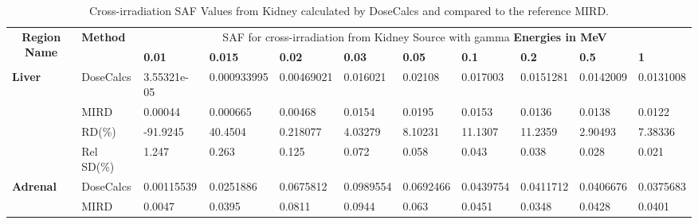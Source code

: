 \documentclass[letterpaper,12pt]{article}
\begin{document}
\begin{table}[H] 
\centering
\caption{Cross-irradiation SAF Values from Kidney calculated by DoseCalcs and compared to the reference MIRD. } 
\begin{adjustbox}{width=\columnwidth,center}
\begin{threeparttable}
\begin{tabular}{lllllllllll} \hline 
\multicolumn{1}{c}{\multirow{2}{*}{\textbf{Region Name}}} & \multirow{2}{*}{\textbf{Method}} & \multicolumn{9}{c}{ SAF for cross-irradiation from Kidney Source with gamma \textbf{Energies in MeV}}       \\ \cline{3-11}
                 \multicolumn{1}{c}{}                             & \multicolumn{1}{c}{}                           & \textbf{0.01}   & \textbf{0.015}   & \textbf{0.02}   & \textbf{0.03}   & \textbf{0.05}   & \textbf{0.1}   & \textbf{0.2}   & \textbf{0.5}   & \textbf{1}       \\\hline 
\multirow{4}{*}{\textbf{Liver}}       & DoseCalcs                                         & 3.55321e-05        & 0.000933995        & 0.00469021        & 0.016021        & 0.02108        & 0.017003        & 0.0151281        & 0.0142009        & 0.0131008        \\ 
                             & MIRD                                        & 0.00044        & 0.000665        & 0.00468        & 0.0154        & 0.0195        & 0.0153        & 0.0136        & 0.0138        & 0.0122        \\ 
                             & RD(\%)\tnote{a}                                         & -91.9245        & 40.4504        & 0.218077        & 4.03279        & 8.10231        & 11.1307        & 11.2359        & 2.90493        & 7.38336        \\ 
                             & Rel SD(\%)\tnote{b}                                          & 1.247        & 0.263        & 0.125        & 0.072        & 0.058        & 0.043        & 0.038        & 0.028        & 0.021               \\\hline 
\multirow{4}{*}{\textbf{Adrenal}}       & DoseCalcs                                         & 0.00115539        & 0.0251886        & 0.0675812        & 0.0989554        & 0.0692466        & 0.0439754        & 0.0411712        & 0.0406676        & 0.0375683        \\ 
                             & MIRD                                        & 0.0047        & 0.0395        & 0.0811        & 0.0944        & 0.063        & 0.0451        & 0.0348        & 0.0428        & 0.0401        \\ 

\end{tabular}
\end{threeparttable}
\end{adjustbox}
\end{table}
\end{document}
